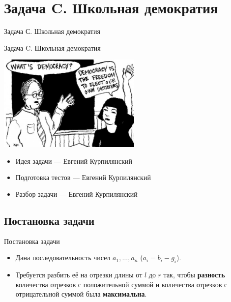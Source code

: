 \section{Задача C. Школьная демократия}

\begin{frame}[t]{Задача С. Школьная демократия}

  \begin{center}
    \LARGE Задача C. Школьная демократия
  \end{center}
  \begin{center}
	  \includegraphics[width=7cm]{pics/democracy2.jpg}
  \end{center}
\end{frame}

\begin{frame}[t]{}
  \vspace{3cm}

  \begin{itemize}
    \item Идея задачи --- Евгений Курпилянский
    \item Подготовка тестов --- Евгений Курпилянский
    \item Разбор задачи --- Евгений Курпилянский
  \end{itemize}
\end{frame}

\subsection{Постановка задачи}

\begin{frame}[t]{Постановка задачи}
\begin{itemize}
  \item Дана последовательность чисел $a_1, \ldots, a_n$ ($a_i = b_i - g_i$).
  \item Требуется разбить её на отрезки длины от $l$ до $r$ так, чтобы
  {\bf разность} количества отрезков с положительной суммой и
  количества отрезков с отрицательной суммой была {\bf максимальна}.
\end{itemize}
\end{frame}


